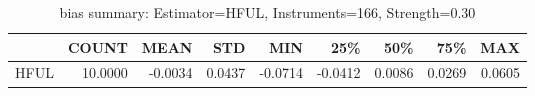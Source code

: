 \begin{table}[ht]
\centering
\caption{bias summary: Estimator=HFUL, Instruments=166, Strength=0.30}
\begin{tabular}{lrrrrrrrr}
\toprule
 & COUNT & MEAN & STD & MIN & 25\% & 50\% & 75\% & MAX \\
\midrule
HFUL & 10.0000 & -0.0034 & 0.0437 & -0.0714 & -0.0412 & 0.0086 & 0.0269 & 0.0605 \\
\bottomrule
\end{tabular}
\end{table}
